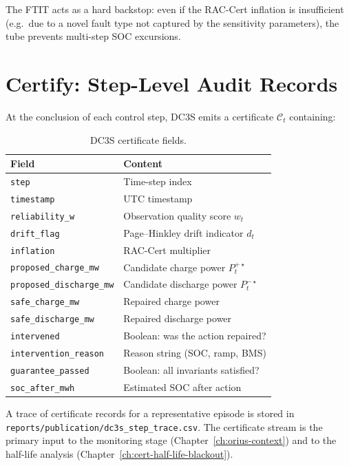 The FTIT acts as a hard backstop: even if the RAC-Cert inflation is
insufficient (e.g.\ due to a novel fault type not captured by the
sensitivity parameters), the tube prevents multi-step SOC excursions.

\section{Certify: Step-Level Audit Records}
\label{sec:certify}

At the conclusion of each control step, DC3S emits a certificate
$\mathcal{C}_t$ containing:

\begin{table}[ht]
\centering
\caption{DC3S certificate fields.}
\label{tab:certificate-fields}
\begin{tabular}{ll}
\toprule
\textbf{Field} & \textbf{Content} \\
\midrule
\texttt{step}                    & Time-step index \\
\texttt{timestamp}               & UTC timestamp \\
\texttt{reliability\_w}          & Observation quality score $w_t$ \\
\texttt{drift\_flag}             & Page--Hinkley drift indicator $d_t$ \\
\texttt{inflation}               & RAC-Cert multiplier \\
\texttt{proposed\_charge\_mw}    & Candidate charge power $P_t^{+\star}$ \\
\texttt{proposed\_discharge\_mw} & Candidate discharge power $P_t^{-\star}$ \\
\texttt{safe\_charge\_mw}        & Repaired charge power \\
\texttt{safe\_discharge\_mw}     & Repaired discharge power \\
\texttt{intervened}              & Boolean: was the action repaired? \\
\texttt{intervention\_reason}    & Reason string (SOC, ramp, BMS) \\
\texttt{guarantee\_passed}       & Boolean: all invariants satisfied? \\
\texttt{soc\_after\_mwh}         & Estimated SOC after action \\
\bottomrule
\end{tabular}
\end{table}

A trace of certificate records for a representative episode is stored in
\texttt{reports/publication/dc3s\_step\_trace.csv}.  The certificate
stream is the primary input to the monitoring stage
(Chapter~\ref{ch:orius-context}) and to the half-life analysis
(Chapter~\ref{ch:cert-half-life-blackout}).

